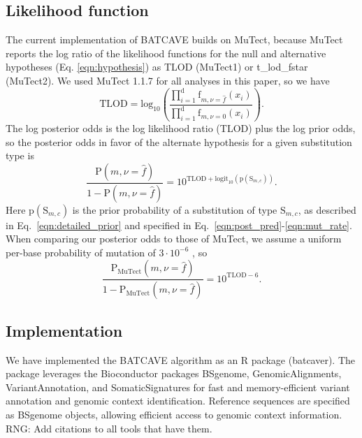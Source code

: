 \documentclass[a4,center,fleqn]{NAR}
\newcommand{\rngcomment}[1]{{\color{red}RNG: #1}}
\newcommand{\batcave}{BATCAVE\xspace}
\begin{document}
\subsection{Likelihood function}
The current implementation of \batcave builds on MuTect, because MuTect reports the log ratio of the likelihood functions for the null and alternative hypotheses (Eq. \ref{eqn:hypothesis}) as \textrm{TLOD} (MuTect1) or \textrm{t\_lod\_fstar} (MuTect2).
We used MuTect 1.1.7 for all analyses in this paper, so we have
\begin{equation}
  \label{eqn:tlod}
    \mathrm{TLOD} = \mathrm{log}_{10}\left(\frac{\prod_{i=1}^{\mathrm{d}} \textrm{f}_{m,\nu = \hat{f}}(x_i)}{\prod_{i=1}^{\mathrm{d}} \textrm{f}_{m,\nu = 0}(x_i)}\right).
\end{equation}
The log posterior odds is the log likelihood ratio (\textrm{TLOD}) plus the log prior odds, so the posterior odds in favor of the alternate hypothesis for a given substitution type is
\begin{equation}
  \label{eqn:computed_posterior}
  \frac{\mathrm{P}(m,\nu = \hat{f})}{1 - \mathrm{P}(m,\nu = \hat{f})} = 10^{\mathrm{TLOD} + \mathrm{logit}_{10}(\mathrm{p}(\mathrm{S}_{m,c}))}.
\end{equation}
Here $\mathrm{p}(\mathrm{S}_{m,c})$ is the prior probability of a substitution of type $\mathrm{S}_{m,c}$, as described in Eq.~\ref{eqn:detailed_prior} and specified in Eq.~\ref{eqn:post_pred}-\ref{eqn:mut_rate}.
When comparing our posterior odds to those of MuTect, we assume a uniform per-base probability of mutation of $3\cdot10^{-6}$ \cite{Cibulskis2013}, so
\begin{equation}  \label{eqn:mutect_posterior}
  \frac{\mathrm{P}_\mathrm{MuTect}(m,\nu = \hat{f})}{1 - \mathrm{P}_\mathrm{MuTect}(m,\nu = \hat{f})} = 10^{\mathrm{TLOD} - 6}.
\end{equation}

\subsection{Implementation}
We have implemented the \batcave algorithm as an R package (batcaver).
The package leverages the Bioconductor packages \textrm{BSgenome}, \textrm{GenomicAlignments}, \textrm{VariantAnnotation}, and \textrm{SomaticSignatures} for fast and memory-efficient variant annotation and genomic context identification.
Reference sequences are specified as BSgenome objects, allowing efficient access to genomic context information.  \rngcomment{Add citations to all tools that have them.}
\end{document}
